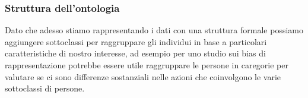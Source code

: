 		\subsubsection{Struttura dell'ontologia}
			Dato che adesso stiamo rappresentando i dati con una struttura formale possiamo aggiungere sottoclassi per raggruppare gli individui in base a particolari caratteristiche di nostro interesse, ad esempio per uno studio sui bias di rappresentazione potrebbe essere utile raggruppare le persone in caregorie per valutare se ci sono differenze sostanziali nelle azioni che coinvolgono le varie sottoclassi di persone.
	
	
